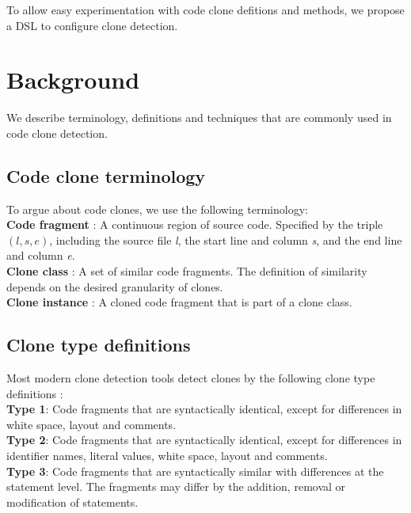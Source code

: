\documentclass[sigplan,10pt,review,anonymous]{acmart}
\begin{document}
To allow easy experimentation with code clone defitions and methods, we propose a DSL to configure clone detection.

\section{Background}
We describe terminology, definitions and techniques that are commonly used in code clone detection.

\subsection{Code clone terminology}
To argue about code clones, we use the following terminology:
\\ \textbf{Code fragment} \cite{svajlenko2019mutation}: A continuous region of source code. Specified by the triple $(l,s,e)$, including the source file \textit{l}, the start line and column \textit{s}, and the end line and column \textit{e}.
\\ \textbf{Clone class} \cite{roy2007survey}: A set of similar code fragments. The definition of similarity depends on the desired granularity of clones.
\\ \textbf{Clone instance} \cite{roy2007survey}: A cloned code fragment that is part of a clone class.

\subsection{Clone type definitions}
Most modern clone detection tools detect clones by the following clone type definitions \cite{svajlenko2014evaluating}:
\\ \textbf{Type 1}: Code fragments that are syntactically identical, except for differences in white space, layout and comments.
\\ \textbf{Type 2}: Code fragments that are syntactically identical, except for differences in identifier names, literal values, white space, layout and comments.
\\ \textbf{Type 3}: Code fragments that are syntactically similar with differences at the statement level. The fragments may differ by the addition, removal or modification of statements.
\end{document}
